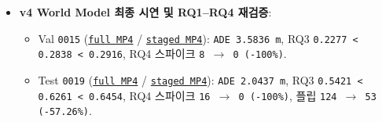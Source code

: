 \documentclass[10.5pt,a4paper]{article}
\begin{document}
\begin{itemize}[leftmargin=1.5em,itemsep=2pt]
\begin{itemize}[leftmargin=1.5em,itemsep=2pt]
\end{itemize}
\item \textbf{v4 World Model 최종 시연 및 RQ1--RQ4 재검증}:
\begin{itemize}[leftmargin=1.5em,itemsep=2pt]
\item Val \texttt{0015} (\href{https://github.com/Heisnotanimposter/Totalcare\_autonomous\_driving\_Yolov5/blob/main/results/v4\_road\_lane/world\_outputs/v4\_world\_outputs/world\_model\_0015\_full/world\_model\_demo\_0015.mp4}{\texttt{full MP4}} / \href{https://github.com/Heisnotanimposter/Totalcare\_autonomous\_driving\_Yolov5/blob/main/results/v4\_road\_lane/world\_outputs/v4\_world\_outputs/world\_model\_0015\_staged/world\_model\_demo\_0015.mp4}{\texttt{staged MP4}}): \texttt{ADE 3.\allowbreak{}5836 m}, RQ3 \texttt{0.\allowbreak{}2277 < 0.\allowbreak{}2838 < 0.\allowbreak{}2916}, RQ4 스파이크 \texttt{8 $\rightarrow$ 0 (-\allowbreak{}100\%)}.
\item Test \texttt{0019} (\href{https://github.com/Heisnotanimposter/Totalcare\_autonomous\_driving\_Yolov5/blob/main/results/v4\_road\_lane/world\_outputs/v4\_world\_outputs/world\_model\_0019\_full/world\_model\_demo\_0019.mp4}{\texttt{full MP4}} / \href{https://github.com/Heisnotanimposter/Totalcare\_autonomous\_driving\_Yolov5/blob/main/results/v4\_road\_lane/world\_outputs/v4\_world\_outputs/world\_model\_0019\_staged/world\_model\_demo\_0019.mp4}{\texttt{staged MP4}}): \texttt{ADE 2.\allowbreak{}0437 m}, RQ3 \texttt{0.\allowbreak{}5421 < 0.\allowbreak{}6261 < 0.\allowbreak{}6454}, RQ4 스파이크 \texttt{16 $\rightarrow$ 0 (-\allowbreak{}100\%)}, 플립 \texttt{124 $\rightarrow$ 53 (-\allowbreak{}57.\allowbreak{}26\%)}.
\end{itemize}
\end{itemize}
\end{document}
